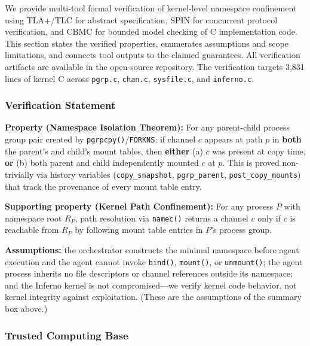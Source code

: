 \documentclass[acmsmall,screen,review]{acmart}
\begin{document}
We provide multi-tool formal verification of kernel-level namespace confinement using
TLA+/TLC for abstract specification, SPIN for concurrent protocol verification, and
CBMC for bounded model checking of C implementation code. This section states the
verified properties, enumerates assumptions and scope limitations, and connects tool
outputs to the claimed guarantees. All verification artifacts are available in the
open-source repository. The verification targets 3,831 lines of kernel C across
\texttt{pgrp.c}, \texttt{chan.c}, \texttt{sysfile.c}, and \texttt{inferno.c}.

\subsubsection{Verification Statement}

\textbf{Property (Namespace Isolation Theorem):} For any parent-child process group
pair created by \texttt{pgrpcpy()}/\texttt{FORKNS}: if channel $c$ appears at path $p$
in \textbf{both} the parent's and child's mount tables, then \textbf{either} (a) $c$
was present at copy time, \textbf{or} (b) both parent and child independently mounted
$c$ at $p$. This is proved non-trivially via history variables (\texttt{copy\_snapshot},
\texttt{pgrp\_parent}, \texttt{post\_copy\_mounts}) that track the provenance of every
mount table entry.

\textbf{Supporting property (Kernel Path Confinement):} For any process $P$ with
namespace root $R_P$, path resolution via \texttt{namec()} returns a channel $c$ only
if $c$ is reachable from $R_P$ by following mount table entries in $P$'s process group.

\textbf{Assumptions:} the orchestrator constructs the minimal namespace before agent execution and the agent cannot invoke \texttt{bind()}, \texttt{mount()}, or \texttt{unmount()}; the agent process inherits no file descriptors or channel references outside its namespace; and the Inferno kernel is not compromised---we verify kernel code behavior, not kernel integrity against exploitation. (These are the assumptions of the summary box above.)

\subsubsection{Trusted Computing Base}
\end{document}
